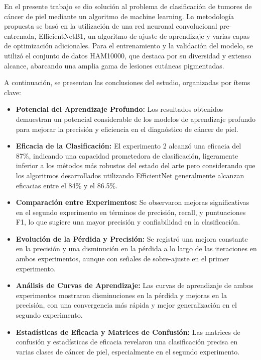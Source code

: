 \begin{conclusions}
En el presente trabajo se dio solución al problema de clasificación de tumores de cáncer de piel mediante un algoritmo de machine learning. La metodología propuesta se basó en la utilización de una red neuronal convolucional pre-entrenada, EfficientNetB1, un algoritmo de ajuste de aprendizaje y varias capas de optimización adicionales. Para el entrenamiento y la validación del modelo, se utilizó el conjunto de datos HAM10000, que destaca por su diversidad y extenso alcance, abarcando una amplia gama de lesiones cutáneas pigmentadas.

A continuación, se presentan las conclusiones del estudio, organizadas por ítems clave:

\begin{itemize}
    \item \textbf{Potencial del Aprendizaje Profundo:} Los resultados obtenidos demuestran un potencial considerable de los modelos de aprendizaje profundo para mejorar la precisión y eficiencia en el diagnóstico de cáncer de piel.
    
    \item \textbf{Eficacia de la Clasificación:} El experimento 2 alcanzó una eficacia del 87\%, indicando una capacidad prometedora de clasificación, ligeramente inferior a los métodos más robustos del estado del arte pero considerando que los algoritmos desarrollados utilizando EfficientNet generalmente alcanzan eficacias entre el 84\% y el 86.5\%.
    
    \item \textbf{Comparación entre Experimentos:} Se observaron mejoras significativas en el segundo experimento en términos de precisión, recall, y puntuaciones F1, lo que sugiere una mayor precisión y confiabilidad en la clasificación.
    
    \item \textbf{Evolución de la Pérdida y Precisión:} Se registró una mejora constante en la precisión y una disminución en la pérdida a lo largo de las iteraciones en ambos experimentos, aunque con señales de sobre-ajuste en el primer experimento.
    
    \item \textbf{Análisis de Curvas de Aprendizaje:} Las curvas de aprendizaje de ambos experimentos mostraron disminuciones en la pérdida y mejoras en la precisión, con una convergencia más rápida y mejor generalización en el segundo experimento.
    
    \item \textbf{Estadísticas de Eficacia y Matrices de Confusión:} Las matrices de confusión y estadísticas de eficacia revelaron una clasificación precisa en varias clases de cáncer de piel, especialmente en el segundo experimento.


\end{itemize}
\end{conclusions}
